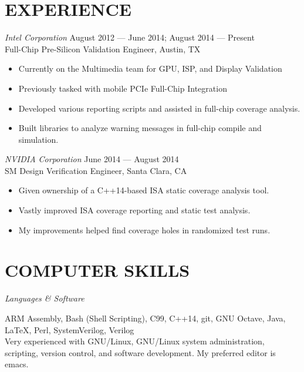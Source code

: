 \documentclass[margin]{res}
\begin{document}
\begin{resume}
  \section{EXPERIENCE}
  {\sl Intel Corporation}
  \hfill August 2012 --- June 2014; August 2014 --- Present \\
  Full-Chip Pre-Silicon Validation Engineer, Austin, TX
  \vspace{0.25em}
  \begin{itemize}
  \item Currently on the Multimedia team for GPU, ISP, and
    Display Validation
  \item Previously tasked with mobile PCIe Full-Chip Integration
  \item Developed various reporting scripts and assisted in full-chip
    coverage analysis.
  \item Built libraries to analyze warning messages in full-chip
    compile and simulation.
  \end{itemize}
  {\sl NVIDIA Corporation}
  \hfill June 2014 --- August 2014 \\
  SM Design Verification Engineer, Santa Clara, CA
  \vspace{0.25em}
  \begin{itemize}
  \item Given ownership of a C++14-based ISA static coverage analysis
    tool.
  \item Vastly improved ISA coverage reporting and static test
    analysis.
  \item My improvements helped find coverage holes in randomized test
    runs.
  \end{itemize}

  \section{COMPUTER SKILLS}
  {\sl Languages \& Software} \\
  \vspace{-1.0em}
  \begin{adjustwidth}{1.5em}{0pt}
    ARM Assembly, Bash (Shell Scripting), C99, C++14, git, GNU Octave,
    Java, \LaTeX, Perl, SystemVerilog, Verilog
    \vspace{0.5em} \\
    Very experienced with GNU/Linux, GNU/Linux system administration,
    scripting, version control, and software development. My preferred
    editor is emacs.
  \end{adjustwidth}


\end{resume}
\end{document}
